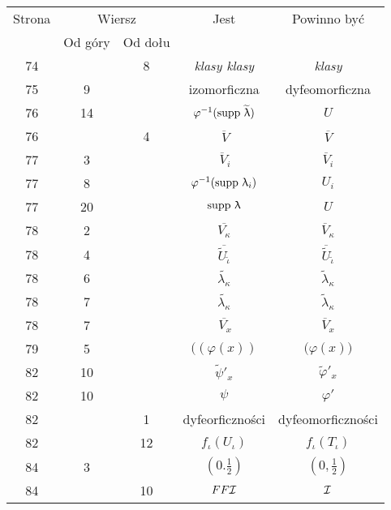 \documentclass[a4paper,11pt]{article}
\begin{document}
\begin{center}
  \begin{tabular}{|c|c|c|c|c|}
    \hline
    Strona & \multicolumn{2}{c|}{Wiersz} & Jest
                              & Powinno być \\ \cline{2-3}
    & Od góry & Od dołu & & \\
    \hline
    74  & & \hphantom{0}8 & \textit{klasy klasy} & \textit{klasy} \\
    75  & \hphantom{0}9 & & izomorficzna & dyfeomorficzna \\
    76  & 14 & & $\varphi^{ -1 }( \mathrm{supp}\, \, \widetilde{ \uplambda } )$ & $U$ \\
    76  & & \hphantom{0}4 & $\overline{ \, V }$ & $\overline{ V }$ \\
    77  & \hphantom{0}3 & & $\overline{ \, V }_{ i }$
    & $\overline{ V }_{ i }$ \\
    77  & \hphantom{0}8 & & $\varphi^{ -1 }( \mathrm{supp}\, \, \uplambda_{ i } )$ & $U_{ i }$ \\
    77  & 20 & & $\mathrm{supp}\, \, \uplambda$ & $U$ \\
    78  & \hphantom{0}2 & & $\overline{ V_{ \kappa } }$
    & $\overline{ V }_{ \kappa }$ \\[0.3em]
    78  & \hphantom{0}4 & & $\overline{ \widetilde{ U }_{ \tilde{ \iota } } }$
           & $\overline{ \widetilde{ U } }_{ \tilde{ \iota } }$ \\
    78  & \hphantom{0}6 & & $\widetilde{ \lambda_{ \kappa } }$
    & $\widetilde{ \lambda }_{ \kappa }$ \\
    78  & \hphantom{0}7 & & $\widetilde{ \lambda_{ \kappa } }$
    & $\widetilde{ \lambda }_{ \kappa }$ \\
    78  & \hphantom{0}7 & & $\overline{ \, V_{ x } }$
           & $\overline{ V }_{ x }$ \\
    79  & \hphantom{0}5 & & $( ( \varphi( x ) )$ & $\big( \varphi( x ) \big)$ \\
    82  & 10 & & $\widetilde{ \psi }'_{ x }$
           & $\widetilde{ \varphi }'_{ x }$ \\
    82  & 10 & & $\psi$ & $\varphi'$ \\
    82  & & \hphantom{0}1 & dyfeorficzności & dyfeomorficzności \\
    82  & & 12 & $f_{ \iota }( U_{ \iota } )$ & $f_{ \iota }( T_{ \iota } )$ \\
    84  & \hphantom{0}3 & & $( 0. \frac{ 1 }{ 2 } )$
    & $( 0, \frac{ 1 }{ 2 } )$ \\
    84  & & 10 & $FF\mathcal{I}$ & $\mathcal{I}$ \\

\end{tabular}
\end{center}
\end{document}
